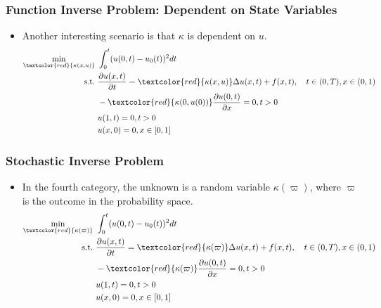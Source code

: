 \documentclass{beamer}
\begin{document}
\begin{frame}
	\frametitle{Function Inverse Problem: Dependent on State Variables}
	\begin{itemize}
		\item Another interesting scenario is that $\kappa$ is dependent on $u$. 
		$$\begin{aligned}
\min_{\textcolor{red}{\kappa(x, u)}}\ & \int_{0}^t ( u(0, t)- u_0(t))^2 dt\\
\mathrm{s.t.}\ & \frac{\partial u(x, t)}{\partial t} = \textcolor{red}{\kappa(x, u)}\Delta u(x, t) + f(x, t), \quad t\in (0,T), x\in (0,1) \\
& -\textcolor{red}{\kappa(0, u(0))}\frac{\partial u(0,t)}{\partial x} = 0, t>0\\
& u(1, t) = 0, t>0\\
& u(x, 0) = 0, x\in [0,1]
\end{aligned}$$

	\end{itemize}
\end{frame}

\begin{frame}
	\frametitle{Stochastic Inverse Problem}
	\begin{itemize}
		\item In the fourth category, the unknown is a random variable $\kappa(\varpi)$, where $\varpi$ is the outcome in the probability space. 
		$$\begin{aligned}
\min_{\textcolor{red}{\kappa(\varpi)}}\ & \int_{0}^t ( u(0, t)- u_0(t))^2 dt\\
\mathrm{s.t.}\ & \frac{\partial u(x, t)}{\partial t} = \textcolor{red}{\kappa(\varpi)}\Delta u(x, t) + f(x, t), \quad t\in (0,T), x\in (0,1) \\
& -\textcolor{red}{\kappa(\varpi)}\frac{\partial u(0,t)}{\partial x} = 0, t>0\\
& u(1, t) = 0, t>0\\
& u(x, 0) = 0, x\in [0,1]
\end{aligned}$$

	\end{itemize}
\end{frame}
\end{document}

